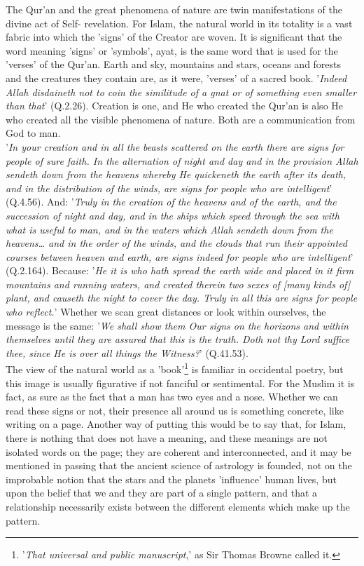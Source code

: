 \documentclass[11pt, b5paper, twoside]{book}
\begin{document}
The Qur'an and the great phenomena of nature are twin manifestations of the divine act of Self-
revelation. For Islam, the natural world in its totality is a vast fabric into which the 'signs' of 
the Creator are woven. It is significant that the word meaning 'signs' or 'symbols', ayat, is the 
same word that is used for the 'verses' of the Qur'an. Earth and sky, mountains and stars, oceans and 
forests and the creatures they contain are, as it were, 'verses' of a sacred book. '\emph{Indeed Allah 
disdaineth not to coin the similitude of a gnat or of something even smaller than that}' (Q.2.26). 
Creation is one, and He who created the Qur'an is also He who created all the visible phenomena of 
nature. Both are a communication from God to man. \\

'\emph{In your creation and in all the beasts scattered on the earth there are signs for people of sure 
faith. In the alternation of night and day and in the provision Allah sendeth down from the heavens 
whereby He quickeneth the earth after its death, and in the distribution of the winds, are signs for 
people who are intelligent}' (Q.4.56). And: '\emph{Truly in the creation of the heavens and of the earth, 
and the succession of night and day, and in the ships which speed through the sea with what is useful 
to man, and in the waters which Allah sendeth down from the heavens\ldots{} and in the order of the 
winds, and the clouds that run their appointed courses between heaven and earth, are signs indeed for 
people who are intelligent}' (Q.2.164). Because: '\emph{He it is who hath spread the earth wide and placed in it firm mountains and running waters, and created therein two sexes of [many kinds of] plant, and causeth the night to cover the day. Truly in all this are signs for people who reflect.}' Whether we 
scan great distances or look within ourselves, the message is the same: '\emph{We shall show them Our signs on the horizons and within themselves until they are assured that this is the truth. Doth not thy 
Lord suffice thee, since He is over all things the Witness?}' (Q.41.53). \\

The view of the natural world as a 'book'\footnote{'\emph{That universal and public manuscript},' as Sir Thomas Browne called it.} is familiar in occidental poetry, but this image is usually figurative if not fanciful or sentimental. For the Muslim it is fact, as sure as the fact that a man has two eyes and a nose. Whether we can read these signs or not, their presence all around us is something concrete, like writing on a page. Another way of putting this would be to say that, for Islam, there is nothing that does not have a meaning, and these meanings are not isolated words on the page; they are coherent and interconnected, and it may be mentioned in passing that the ancient science of astrology is founded, not on the improbable notion that the stars and the planets 'influence' human lives, but upon the belief that we and they are part of a single pattern, and that a relationship necessarily exists between the different elements which make up the pattern. \\
\end{document}
